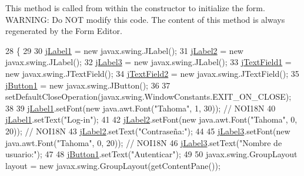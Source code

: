 This method is called from within the constructor to initialize the form. W\+A\+R\+N\+I\+NG\+: Do N\+OT modify this code. The content of this method is always regenerated by the Form Editor. 
\begin{DoxyCode}
28                                   \{
29 
30         \mbox{\hyperlink{classsoftware_1_1login_ad0f5337669524109d8aa4bdb121a2b6b}{jLabel1}} = \textcolor{keyword}{new} javax.swing.JLabel();
31         \mbox{\hyperlink{classsoftware_1_1login_a58160102e1811efcd53ef135c19909a5}{jLabel2}} = \textcolor{keyword}{new} javax.swing.JLabel();
32         \mbox{\hyperlink{classsoftware_1_1login_a35cc02634a69b5d3cf15f9ad2a4892dd}{jLabel3}} = \textcolor{keyword}{new} javax.swing.JLabel();
33         \mbox{\hyperlink{classsoftware_1_1login_a690b80a1950fed323a4be5b825d60bce}{jTextField1}} = \textcolor{keyword}{new} javax.swing.JTextField();
34         \mbox{\hyperlink{classsoftware_1_1login_a4e1d1476f2bc1aed6116d7ffb239eb52}{jTextField2}} = \textcolor{keyword}{new} javax.swing.JTextField();
35         \mbox{\hyperlink{classsoftware_1_1login_a4dd489e2e09616f63d7fcbe94b4a6cd5}{jButton1}} = \textcolor{keyword}{new} javax.swing.JButton();
36 
37         setDefaultCloseOperation(javax.swing.WindowConstants.EXIT\_ON\_CLOSE);
38 
39         \mbox{\hyperlink{classsoftware_1_1login_ad0f5337669524109d8aa4bdb121a2b6b}{jLabel1}}.setFont(\textcolor{keyword}{new} java.awt.Font(\textcolor{stringliteral}{"Tahoma"}, 1, 30)); \textcolor{comment}{// NOI18N}
40         \mbox{\hyperlink{classsoftware_1_1login_ad0f5337669524109d8aa4bdb121a2b6b}{jLabel1}}.setText(\textcolor{stringliteral}{"Log-in"});
41 
42         \mbox{\hyperlink{classsoftware_1_1login_a58160102e1811efcd53ef135c19909a5}{jLabel2}}.setFont(\textcolor{keyword}{new} java.awt.Font(\textcolor{stringliteral}{"Tahoma"}, 0, 20)); \textcolor{comment}{// NOI18N}
43         \mbox{\hyperlink{classsoftware_1_1login_a58160102e1811efcd53ef135c19909a5}{jLabel2}}.setText(\textcolor{stringliteral}{"Contraseña:"});
44 
45         \mbox{\hyperlink{classsoftware_1_1login_a35cc02634a69b5d3cf15f9ad2a4892dd}{jLabel3}}.setFont(\textcolor{keyword}{new} java.awt.Font(\textcolor{stringliteral}{"Tahoma"}, 0, 20)); \textcolor{comment}{// NOI18N}
46         \mbox{\hyperlink{classsoftware_1_1login_a35cc02634a69b5d3cf15f9ad2a4892dd}{jLabel3}}.setText(\textcolor{stringliteral}{"Nombre de usuario:"});
47 
48         \mbox{\hyperlink{classsoftware_1_1login_a4dd489e2e09616f63d7fcbe94b4a6cd5}{jButton1}}.setText(\textcolor{stringliteral}{"Autenticar"});
49 
50         javax.swing.GroupLayout layout = \textcolor{keyword}{new} javax.swing.GroupLayout(getContentPane());

\end{DoxyCode}
